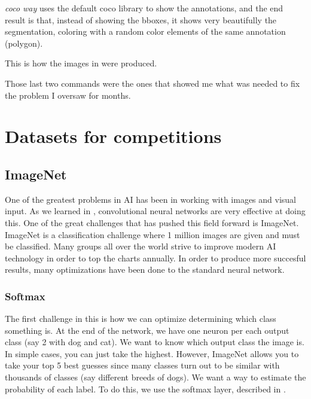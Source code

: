 \emph{coco way} uses the default coco library to show the annotations, and the end result is that, instead of showing the bboxes, it shows very beautifully the segmentation, coloring with a random color elements of the same annotation (polygon).

This is how the images in  were produced.

Those last two commands were the ones that showed me what was needed to fix the problem I oversaw for months.




\section{Datasets for competitions}\label{s:ds-cpt}

\subsection{ImageNet}\label{s:imagenet}
One of the greatest problems in AI has been in working with images and visual input. As we learned in , convolutional neural networks are very effective at doing this. One of the great challenges that has pushed this field forward is ImageNet. ImageNet is a classification challenge where 1 million images are given and must be classified. Many groups all over the world strive to improve modern AI technology in order to top the charts annually. In order to produce more succesful results, many optimizations have been done to the standard neural network.

\subsubsection{Softmax}

The first challenge in this is how we can optimize determining which class something is. At the end of the network, we have one neuron per each output class (say 2 with dog and cat). We want to know which output class the image is. In simple cases, you can just take the highest. However, ImageNet allows you to take your top 5 best guesses since many classes turn out to be similar with thousands of classes (say different breeds of dogs). We want a way to estimate the probability of each label. To do this, we use the softmax layer, described in .

